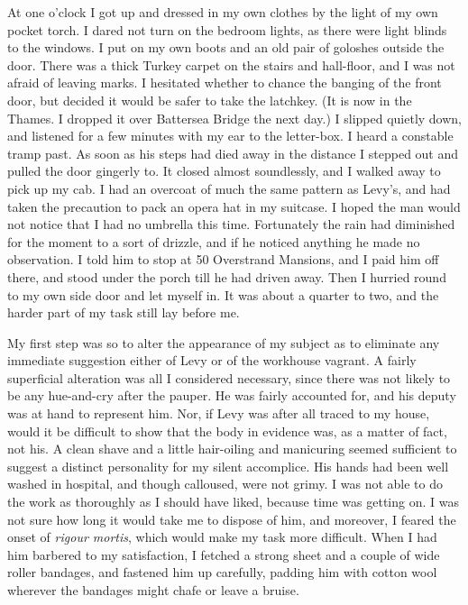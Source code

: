At one o'clock I got up and dressed in my own clothes by the light of my own pocket torch. I dared not turn on the bedroom lights, as there were light blinds to the windows. I put on my own boots and an old pair of goloshes outside the door. There was a thick Turkey carpet on the stairs and hall-floor, and I was not afraid of leaving marks. I hesitated whether to chance the banging of the front door, but decided it would be safer to take the latchkey. (It is now in the Thames. I dropped it over Battersea Bridge the next day.) I slipped quietly down, and listened for a few minutes with my ear to the letter-box. I heard a constable tramp past. As soon as his steps had died away in the distance I stepped out and pulled the door gingerly to. It closed almost soundlessly, and I walked away to pick up my cab. I had an overcoat of much the same pattern as Levy's, and had taken the precaution to pack an opera hat in my suitcase. I hoped the man would not notice that I had no umbrella this time. Fortunately the rain had diminished for the moment to a sort of drizzle, and if he noticed anything he made no observation. I told him to stop at 50 Overstrand Mansions, and I paid him off there, and stood under the porch till he had driven away. Then I hurried round to my own side door and let myself in. It was about a quarter to two, and the harder part of my task still lay before me.

My first step was so to alter the appearance of my subject as to eliminate any immediate suggestion either of Levy or of the workhouse vagrant. A fairly superficial alteration was all I considered necessary, since there was not likely to be any hue-and-cry after the pauper. He was fairly accounted for, and his deputy was at hand to represent him. Nor, if Levy was after all traced to my house, would it be difficult to show that the body in evidence was, as a matter of fact, not his. A clean shave and a little hair-oiling and manicuring seemed sufficient to suggest a distinct personality for my silent accomplice. His hands had been well washed in hospital, and though calloused, were not grimy. I was not able to do the work as thoroughly as I should have liked, because time was getting on. I was not sure how long it would take me to dispose of him, and moreover, I feared the onset of \textit{rigour mortis}, which would make my task more difficult. When I had him barbered to my satisfaction, I fetched a strong sheet and a couple of wide roller bandages, and fastened him up carefully, padding him with cotton wool wherever the bandages might chafe or leave a bruise.

